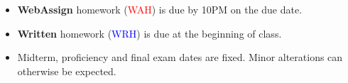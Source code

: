 \documentclass[12pt]{article}
\begin{document}
\begin{itemize}
\item \textbf{WebAssign} homework (\textcolor{red}{WAH}) is due by 10PM on the due date. 
\item \textbf{Written} homework (\textcolor{blue}{WRH}) is due at the beginning of class.
\item Midterm, proficiency and final exam dates are fixed. Minor
alterations can otherwise be expected.
\end{itemize}


\end{document}
